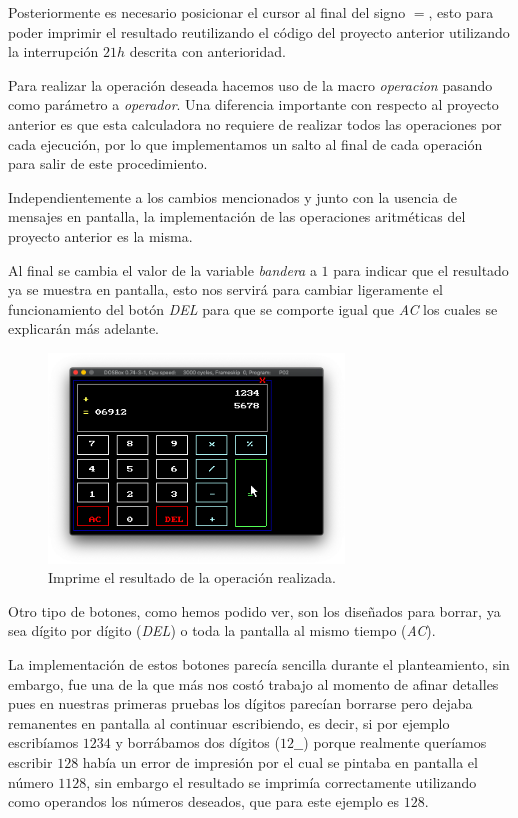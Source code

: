 \documentclass[letterpaper,12 pt,titlepage]{article}
\begin{document}
    Posteriormente es necesario posicionar el cursor al final del signo $=$, esto para poder imprimir el resultado reutilizando el código del proyecto anterior utilizando la interrupción $21h$ descrita con anterioridad. 

    Para realizar la operación deseada hacemos uso de la macro \textit{operacion} pasando como parámetro a \textit{operador}. Una diferencia importante con respecto al proyecto anterior es que esta calculadora no requiere de realizar todos las operaciones por cada ejecución, por lo que implementamos un salto al final de cada operación para salir de este procedimiento. 
    
    Independientemente a los cambios mencionados y junto con la usencia de mensajes en pantalla, la implementación de las operaciones aritméticas del proyecto anterior es la misma.

    Al final se cambia el valor de la variable \textit{bandera} a $1$ para indicar que el resultado ya se muestra en pantalla, esto nos servirá para cambiar ligeramente el funcionamiento del botón \textit{DEL} para que se comporte igual que \textit{AC} los cuales se explicarán más adelante.

    \begin{figure}[H]
    \centering
    \includegraphics[width=0.7\textwidth]{img/28.png}
    \caption{Imprime el resultado de la operación realizada.}
    \end{figure}

    Otro tipo de botones, como hemos podido ver, son los diseñados para borrar, ya sea dígito por dígito (\textit{DEL}) o toda la pantalla al mismo tiempo (\textit{AC}).

    La implementación de estos botones parecía sencilla durante el planteamiento, sin embargo, fue una de la que más nos costó trabajo al momento de afinar detalles pues en nuestras primeras pruebas los dígitos parecían borrarse pero dejaba remanentes en pantalla al continuar escribiendo, es decir, si por ejemplo escribíamos $1234$ y borrábamos dos dígitos ($12\_\_$) porque realmente queríamos escribir $128$ había un error de impresión por el cual se pintaba en pantalla el número $1128$, sin embargo el resultado se imprimía correctamente utilizando como operandos los números deseados, que para este ejemplo es $128$.
\end{document}
